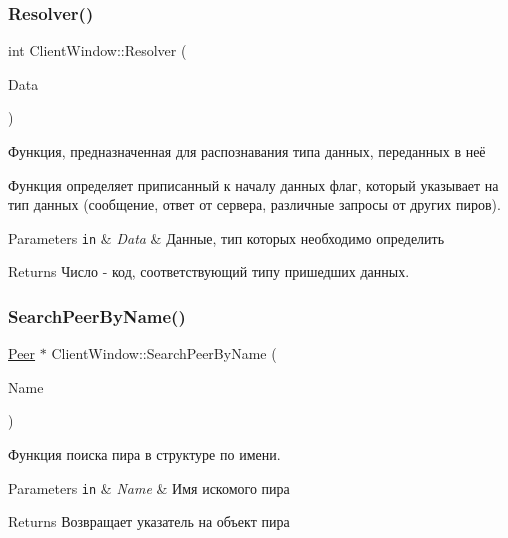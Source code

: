\subsubsection{\texorpdfstring{Resolver()}{Resolver()}}
{\footnotesize\ttfamily int Client\+Window\+::\+Resolver (\begin{DoxyParamCaption}\item[{const Q\+String \&}]{Data }\end{DoxyParamCaption})\hspace{0.3cm}{\ttfamily [private]}}



Функция, предназначенная для распознавания типа данных, переданных в неё 

Функция определяет приписанный к началу данных флаг, который указывает на тип данных (сообщение, ответ от сервера, различные запросы от других пиров). 
\begin{DoxyParams}[1]{Parameters}
\mbox{\tt in}  & {\em Data} & Данные, тип которых необходимо определить \\
\hline
\end{DoxyParams}
\begin{DoxyReturn}{Returns}
Число -\/ код, соответствующий типу пришедших данных. 
\end{DoxyReturn}
\mbox{\label{class_client_window_a040d239df2ae3f017b371ed2367642e5}} 
\subsubsection{\texorpdfstring{Search\+Peer\+By\+Name()}{SearchPeerByName()}}
{\footnotesize\ttfamily \hyperlink{class_peer}{Peer} $\ast$ Client\+Window\+::\+Search\+Peer\+By\+Name (\begin{DoxyParamCaption}\item[{const Q\+String \&}]{Name }\end{DoxyParamCaption})\hspace{0.3cm}{\ttfamily [private]}}



Функция поиска пира в структуре по имени. 


\begin{DoxyParams}[1]{Parameters}
\mbox{\tt in}  & {\em Name} & Имя искомого пира \\
\hline
\end{DoxyParams}
\begin{DoxyReturn}{Returns}
Возвращает указатель на объект пира 
\end{DoxyReturn}
\mbox{\label{class_client_window_a8c4913533d66f626237a353e98b81d69}} 
